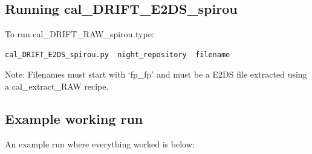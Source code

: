 \subsection{Running cal\_DRIFT\_E2DS\_spirou}

To run cal\_DRIFT\_RAW\_spirou type:
\begin{lstlisting}[language=bash, style=bashstyle]
cal_DRIFT_E2DS_spirou.py  night_repository  filename
\end{lstlisting}

Note: Filenames must start with `fp\_fp' and must be a E2DS file extracted using a cal\_extract\_RAW recipe.

\subsection{Example working run}

An example run where everything worked is below:

